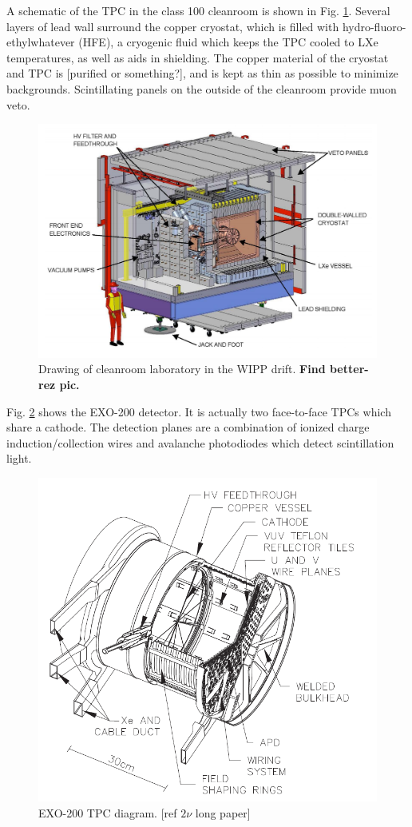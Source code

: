 A schematic of the TPC in the class 100 cleanroom is shown in Fig. \ref{fig:cleanroom}.  Several layers of lead wall surround the copper cryostat, which is filled with hydro-fluoro-ethylwhatever (HFE), a cryogenic fluid which keeps the TPC cooled to LXe temperatures, as well as aids in shielding.  The copper material of the cryostat and TPC is [purified or something?], and is kept as thin as possible to minimize backgrounds.  Scintillating panels on the outside of the cleanroom provide muon veto.

\begin{figure}[H]
	\centering
	\includegraphics[width=.7\textwidth]{figures/cleanroom.png}
	\caption{Drawing of cleanroom laboratory in the WIPP drift.  \textbf{\color{red} Find better-rez pic.}}
\label{fig:cleanroom}
\end{figure}

Fig. \ref{fig:tpc} shows the EXO-200 detector.  It is actually two face-to-face TPCs which share a cathode.  The detection planes are a combination of ionized charge induction/collection wires and avalanche photodiodes which detect scintillation light.

\begin{figure}[H]
	\centering
	\includegraphics[width=.7\textwidth]{figures/TPC.png}
	\caption{EXO-200 TPC diagram.  [ref $2\nu$ long paper]}
\label{fig:tpc}
\end{figure}

